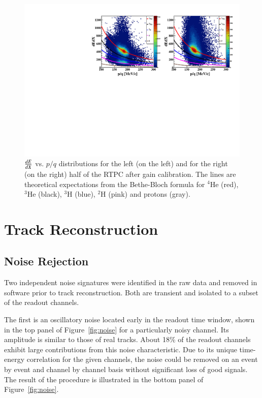 \documentclass[preprint,5p]{elsarticle}
\begin{document}
\begin{figure}[tb]
\centering
\includegraphics[scale=0.73]{f_dedx_p_exp_2nd.pdf}
\caption{$\small{\frac{dE}{dX}}$ vs. $p/q$ distributions for the left (on the 
   left) and for the right (on the right) half of the RTPC after gain 
   calibration. The lines are theoretical expectations from the Bethe-Bloch 
   formula for $^4$He 
   (red), $^3$He (black), $^3$H (blue), $^2$H (pink) and protons (gray).}
\label{fig:dedx_p_exp_2nd}
\end{figure}

\section{Track Reconstruction}
\label{sec_tracking}

\subsection{Noise Rejection}
Two independent noise signatures were identified in the raw data and removed 
in software prior to track reconstruction. Both are transient and isolated to 
a subset of the readout channels. 

The first is an oscillatory noise located early in the readout time window, 
shown in the top panel of Figure~\ref{fig:noise} for a particularly noisy 
channel.  Its amplitude is similar to those of real tracks. About 18\% of the 
readout channels exhibit large contributions from this noise characteristic.  
Due to its unique time-energy correlation for the given channels, the noise 
could be removed on an event by event and channel by channel basis without 
significant loss of good signals. The result of the
procedure is illustrated in the bottom panel of Figure~\ref{fig:noise}.
\end{document}
